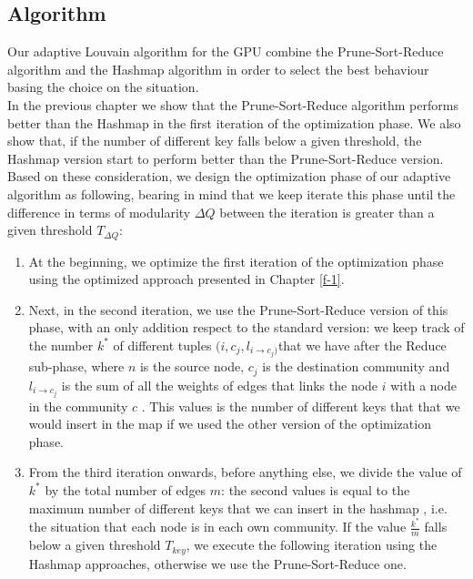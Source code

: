 \subsection{Algorithm}
Our adaptive Louvain algorithm for the GPU combine the Prune-Sort-Reduce algorithm and the Hashmap algorithm in order to select the best behaviour basing the choice on the situation. \\ In the previous chapter we show that the Prune-Sort-Reduce algorithm performs better than the Hashmap in the first iteration of the optimization phase. We also show that, if the number of different key falls below a given threshold, the Hashmap version start to perform better than the Prune-Sort-Reduce version.\\  
Based on these consideration, we design the optimization phase of our adaptive algorithm as following, bearing in mind that we keep iterate this phase until the difference in terms of modularity $\Delta Q$ between the iteration is greater than a given threshold $T_{\Delta Q}$:
\begin{enumerate}
	\item At the beginning, we optimize the first iteration of the optimization phase using the optimized approach presented in Chapter \ref{f-1}.
	\item Next, in the second iteration, we use the Prune-Sort-Reduce version of this phase, with an only addition respect to the standard version: we keep track of the number $k^*$ of different tuples $(i,c_j,l_{i\rightarrow c_j)}$that we have after the Reduce sub-phase,  where $n$ is the source node, $c_j$ is the destination community and $l_{i\rightarrow c_j}$ is the sum of all the weights of edges that links the node $i$ with a node in the community $c$ . This values is the number of different keys that that we would insert in the map if we used the other version of the optimization phase.
	\item From the third iteration onwards, before anything else, we divide the value of $k^*$ by the total number of edges $m$: the second values is equal to the maximum number of different keys that we can insert in the hashmap , i.e. the situation that each node is in each own community. If the value $\frac{k^*}{m}$ falls below a given threshold $T_{key}$, we execute the following iteration using the Hashmap approaches, otherwise we use the Prune-Sort-Reduce one. 
\end{enumerate}
